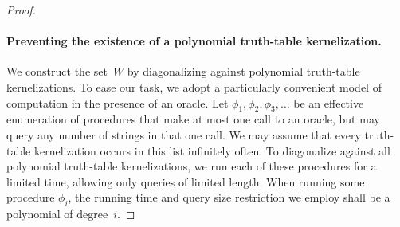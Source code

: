 \begin{proof}
  \paragraph{Preventing the existence of a polynomial truth-table kernelization.}
  We construct the set~$W$ by diagonalizing against polynomial truth-table kernelizations.
  To ease our task, we adopt a particularly convenient model of computation in the presence of an oracle.
  Let $\phi_1, \phi_2, \phi_3, \ldots$ be an effective enumeration of procedures that make at most one call to an oracle, but may query any number of strings in that one call.
  We may assume that every truth-table kernelization occurs in this list infinitely often.
  To diagonalize against all polynomial truth-table kernelizations, we run each of these procedures for a limited time, allowing only queries of limited length.
  When running some procedure $\phi_i$, the running time and query size restriction we employ shall be a polynomial of degree~$i$.


\end{proof}
